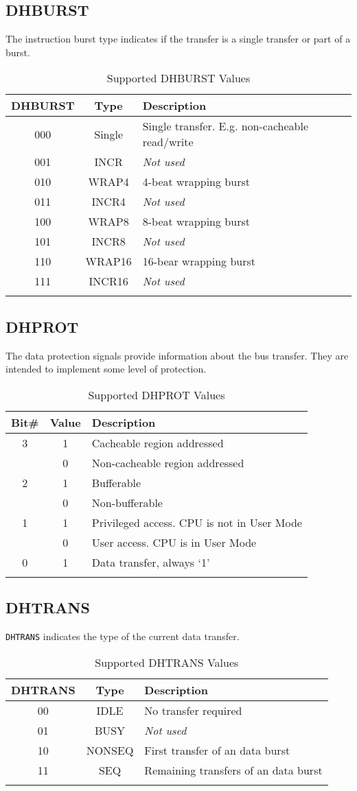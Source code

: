 \subsection{DHBURST}\label{dhburst}

The instruction burst type indicates if the transfer is a single
transfer or part of a burst.

\begin{longtable}[]{@{}ccl@{}}
\toprule
DHBURST & Type & Description\tabularnewline
\midrule
\endhead
000 & Single & Single transfer. E.g. non-cacheable
read/write\tabularnewline
001 & INCR   & \emph{Not used}\tabularnewline
010 & WRAP4  & 4-beat wrapping burst\tabularnewline
011 & INCR4  & \emph{Not used}\tabularnewline
100 & WRAP8  & 8-beat wrapping burst\tabularnewline
101 & INCR8  & \emph{Not used}\tabularnewline
110 & WRAP16 & 16-bear wrapping burst\tabularnewline
111 & INCR16 & \emph{Not used}\tabularnewline
\bottomrule
\caption{Supported DHBURST Values}
\label{tab:dhburst-values}
\end{longtable}


\subsection{DHPROT}\label{dhprot}

The data protection signals provide information about the bus transfer.
They are intended to implement some level of protection.

\begin{longtable}[]{@{}ccl@{}}
\toprule
Bit\# & Value & Description\tabularnewline
\midrule
\endhead
3 & 1 & Cacheable region addressed\tabularnewline
  & 0 & Non-cacheable region addressed\tabularnewline
2 & 1 & Bufferable\tabularnewline
  & 0 & Non-bufferable\tabularnewline
1 & 1 & Privileged access. CPU is not in User Mode\tabularnewline
  & 0 & User access. CPU is in User Mode\tabularnewline
0 & 1 & Data transfer, always `1'\tabularnewline
\bottomrule
\caption{Supported DHPROT Values}
\label{tab:dhprot-values}
\end{longtable}

\subsection{DHTRANS}\label{dhtrans}

\texttt{DHTRANS} indicates the type of the current data transfer.

\begin{longtable}[]{@{}ccl@{}}
\toprule
DHTRANS & Type & Description\tabularnewline
\midrule
\endhead
00 & IDLE   & No transfer required\tabularnewline
01 & BUSY   & \emph{Not used}\tabularnewline
10 & NONSEQ & First transfer of an data burst\tabularnewline
11 & SEQ    & Remaining transfers of an data burst\tabularnewline
\bottomrule
\caption{Supported DHTRANS Values}
\label{tab:dhtrans-values}
\end{longtable}

